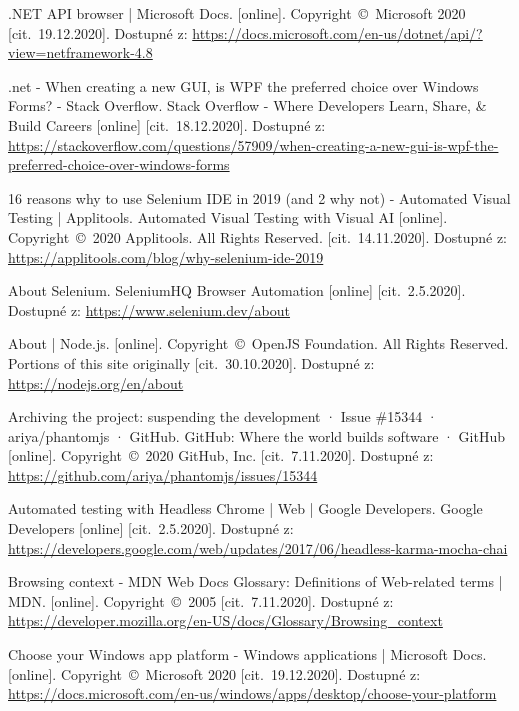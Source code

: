 \newpage
{}
\begin{thebibliography}{99}

 .NET API browser | Microsoft Docs. [online]. Copyright~©~Microsoft 2020 [cit.~19.12.2020]. Dostupné z: \url{https://docs.microsoft.com/en-us/dotnet/api/?view=netframework-4.8}

 .net - When creating a new GUI, is WPF the preferred choice over Windows Forms? - Stack Overflow. Stack Overflow - Where Developers Learn, Share, \& Build Careers [online] [cit.~18.12.2020]. Dostupné z: \url{https://stackoverflow.com/questions/57909/when-creating-a-new-gui-is-wpf-the-preferred-choice-over-windows-forms}

 16 reasons why to use Selenium IDE in 2019 (and 2 why not) - Automated Visual Testing | Applitools. Automated Visual Testing with Visual AI [online]. Copyright~©~2020 Applitools. All Rights Reserved. [cit.~14.11.2020]. Dostupné z: \url{https://applitools.com/blog/why-selenium-ide-2019}

 About Selenium. SeleniumHQ Browser Automation [online] [cit.~2.5.2020]. Dostupné z: \url{https://www.selenium.dev/about}

 About | Node.js. [online]. Copyright~©~OpenJS Foundation. All Rights Reserved. Portions of this site originally [cit.~30.10.2020]. Dostupné z: \url{https://nodejs.org/en/about}

 Archiving the project: suspending the development · Issue \#15344 · ariya/phantomjs · GitHub. GitHub: Where the world builds software · GitHub [online]. Copyright~©~2020 GitHub, Inc. [cit.~7.11.2020]. Dostupné z: \url{https://github.com/ariya/phantomjs/issues/15344}

 Automated testing with Headless Chrome  |  Web  |  Google Developers. Google Developers [online] [cit.~2.5.2020]. Dostupné z: \url{https://developers.google.com/web/updates/2017/06/headless-karma-mocha-chai}

 Browsing context - MDN Web Docs Glossary: Definitions of Web-related terms | MDN. [online]. Copyright~©~2005 [cit.~7.11.2020]. Dostupné z: \url{https://developer.mozilla.org/en-US/docs/Glossary/Browsing_context}

 Choose your Windows app platform - Windows applications | Microsoft Docs. [online]. Copyright~©~Microsoft 2020 [cit.~19.12.2020]. Dostupné z: \url{https://docs.microsoft.com/en-us/windows/apps/desktop/choose-your-platform}


\end{thebibliography}
